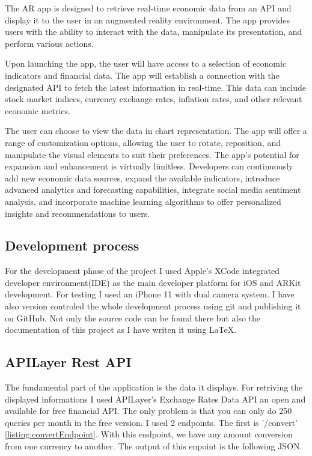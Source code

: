 \documentclass[a4paper,oneside]{article}
\begin{document}
The AR app is designed to retrieve real-time economic data from an API and display it to the user in an augmented reality environment. The app provides users with the ability to interact with the data, manipulate its presentation, and perform various actions.

Upon launching the app, the user will have access to a selection of economic indicators and financial data. The app will establish a connection with the designated API to fetch the latest information in real-time.
This data can include stock market indices, currency exchange rates, inflation rates, and other relevant economic metrics.

The user can choose to view the data in chart representation.
The app will offer a range of customization options, allowing the user to rotate, reposition, and manipulate the visual elements to suit their preferences.
The app's potential for expansion and enhancement is virtually limitless. Developers can continuously add new economic data sources, expand the available indicators, introduce advanced analytics and forecasting capabilities, integrate social media sentiment analysis, and incorporate machine learning algorithms to offer personalized insights and recommendations to users.
\subsection{Development process}
For the development phase of the project I used Apple's XCode integrated developer environment(IDE) as the main developer platform for iOS and ARKit development. For testing I used an iPhone 11 with dual camera system.
I have also version controled the whole development process using git and publishing it on GitHub. Not only the source code can be found there but also the documentation of this project as I have writen it using \LaTeX{}.

\subsection{APILayer Rest API}

The fundamental part of the application is the data it displays. For retriving the displayed informations I used APILayer's Exchange Rates Data API an open and available for free financial API.  The only problem is that you can only do 250 queries per month in the free version. I used 2 endpoints. The first is '/convert' \ref{listing:convertEndpoint}. With this endpoint, we have any amount conversion from one currency to another. The output of this enpoint is the following JSON.
\end{document}
